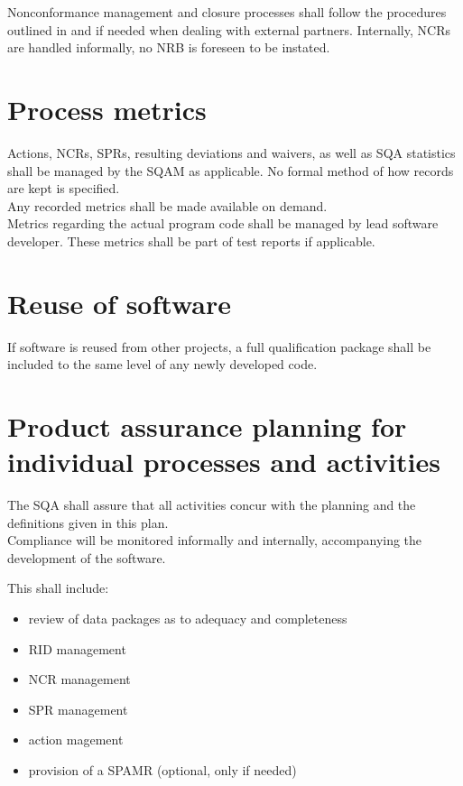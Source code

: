 \noindent
Nonconformance management and closure processes shall follow the procedures
outlined in \cite{ECSS80C} and \cite{ECSSQ1009C} if needed when dealing with
external partners. Internally, \glspl{NCR} are handled informally, no \gls{NRB}
is foreseen to be instated.


\section{Process metrics}

Actions, \glspl{NCR}, \glspl{SPR}, resulting deviations and waivers, as
well as \gls{SQA} statistics shall be managed by the \gls{SQAM} as applicable.
No formal method of how records are kept is specified.\\

\noindent
Any recorded metrics shall be made available on demand.\\

\noindent
Metrics regarding the actual program code shall be managed by lead software
developer. These metrics shall be part of test reports if applicable.


\section{Reuse of software}

If software is reused from other projects, a full qualification package shall
be included to the same level of any newly developed code.



\section{Product assurance planning for individual processes and activities}

The \gls{SQA} shall assure that all activities concur with the planning and the
definitions given in this plan.\\

\noindent
Compliance will be monitored informally and internally, accompanying the
development of the software.

\begin{minipage}{\linewidth}
\noindent
This shall include:

\begin{itemize}
	\item review of data packages as to adequacy and completeness
	\item \gls{RID} management
	\item \gls{NCR} management
	\item \gls{SPR} management
	\item action magement
	\item provision of a \gls{SPAMR} (optional, only if needed)
\end{itemize}
\end{minipage}


